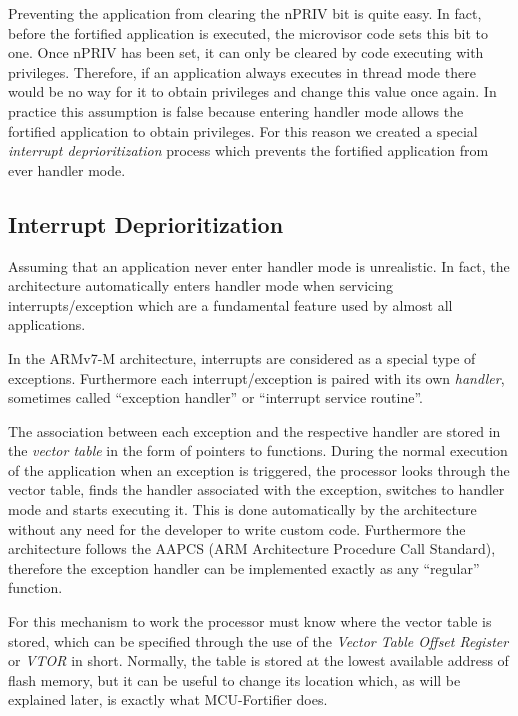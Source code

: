\documentclass{article}
\begin{document}
Preventing the application from clearing the nPRIV bit is quite easy. In fact, before the fortified application is executed, the microvisor code sets this bit to one. Once nPRIV has been set, it can only be cleared by code executing with privileges. Therefore, if an application always executes in thread mode there would be no way for it to obtain privileges and change this value once again. In practice this assumption is false because entering handler mode allows the fortified application to obtain privileges. For this reason we created a special \textit{interrupt deprioritization} process which prevents the fortified application from ever handler mode.

\subsection{Interrupt Deprioritization}
\label{subsec:deprio}
Assuming that an application never enter handler mode is unrealistic. In fact, the architecture automatically enters handler mode when servicing interrupts/exception which are a fundamental feature used by almost all applications.

In the ARMv7-M architecture, interrupts are considered as a special type of exceptions. Furthermore each interrupt/exception is paired with its own \textit{handler}, sometimes called ``exception handler'' or ``interrupt service routine''.

The association between each exception and the respective handler are stored in the \textit{vector table} in the form of pointers to functions. During the normal execution of the application when an exception is triggered, the processor looks through the vector table, finds the handler associated with the exception, switches to handler mode and starts executing it. This is done automatically by the architecture without any need for the developer to write custom code. Furthermore the architecture follows the AAPCS (ARM Architecture Procedure Call Standard), therefore the exception handler can be implemented exactly as any ``regular'' function.

For this mechanism to work the processor must know where the vector table is stored, which can be specified through the use of the \textit{Vector Table Offset Register} or \textit{VTOR} in short. Normally, the table is stored at the lowest available address of flash memory, but it can be useful to change its location which, as will be explained later, is exactly what MCU-Fortifier does.
\end{document}
